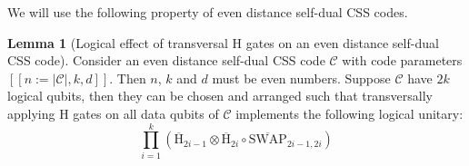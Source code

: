 \documentclass[reprint,aps,twocolumn,superscriptaddress,showpacs,notitlepage,10pt]{revtex4-2}
\theoremstyle{definition}
\newtheorem{lemma}[theorem]{Lemma}
\begin{document}
We will use the following property of even distance self-dual CSS codes. 
\begin{lemma}
    [Logical effect of transversal H gates on an even distance self-dual CSS code] \label{lemma: properties of even distance self-dual CSS codes}
    Consider an even distance self-dual CSS code $\mathcal{C}$ with code parameters $[[n:=|\mathcal{C}|,k,d]]$. Then $n$, $k$ and $d$ must be even numbers. Suppose $\mathcal{C}$ have $2k$ logical qubits, then they can be chosen and arranged such that transversally applying H gates on all data qubits of $\mathcal{C}$  implements the following logical unitary:
    \begin{equation}\label{eq: logical unitary by transversal H}
         \prod_{i=1}^{k}\left( \overline{\mathrm{H}}_{2i-1} \otimes  \overline{\mathrm{H}}_{2i} \circ \overline{\mathrm{SWAP}}_{2i-1,2i} \right)
    \end{equation}
\end{lemma}
\end{document}
